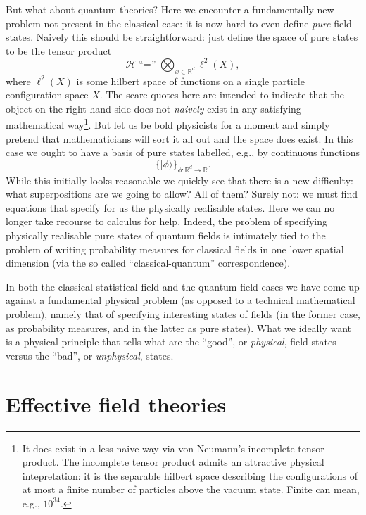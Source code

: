 \documentclass[11pt]{amsart}
\theoremstyle{plain}%
\theoremstyle{definition}
\theoremstyle{remark}
\begin{document}
But what about quantum theories? Here we encounter a fundamentally new problem not present in the classical case: it is now hard to even define \emph{pure} field states. Naively this should be straightforward: just define the space of pure states to be the tensor product
\begin{equation}
	\mathcal{H} \text{``$=$''} \bigotimes_{x\in \mathbb{R}^d} \ell^2(X),
\end{equation}
where $\ell^2(X)$ is some hilbert space of functions on a single particle configuration space $X$. The scare quotes here are intended to indicate that the object on the right hand side does not \emph{naively} exist in any satisfying mathematical way\footnote{It does exist in a less naive way via von Neumann's incomplete tensor product. The incomplete tensor product admits an attractive physical intepretation: it is the separable hilbert space describing the configurations of at most a finite number of particles above the vacuum state. Finite can mean, e.g., $10^{34}$.}. But let us be bold physicists for a moment and simply pretend that mathematicians will sort it all out and the space does exist. In this case we ought to have a basis of pure states labelled, e.g., by continuous functions
\begin{equation}
	\{|\phi\rangle \}_{\phi:\mathbb{R}^d\rightarrow \mathbb{R}}.
\end{equation}
While this initially looks reasonable we quickly see that there is a new difficulty: what superpositions are we going to allow? All of them? Surely not: we must find equations that specify for us the physically realisable states. Here we can no longer take recourse to calculus for help. Indeed, the problem of specifying physically realisable pure states of quantum fields is intimately tied to the problem of writing probability measures for classical fields in one lower spatial dimension (via the so called ``classical-quantum'' correspondence). 

In both the classical statistical field and the quantum field cases we have come up against a fundamental physical problem (as opposed to a technical mathematical problem), namely that of specifying interesting states of fields (in the former case, as probability measures, and in the latter as pure states). What we ideally want is a physical principle that tells what are the ``good'', or \emph{physical}, field states versus the ``bad'', or \emph{unphysical}, states.  

\section{Effective field theories}\label{sec:effectivetheories}
\end{document}
